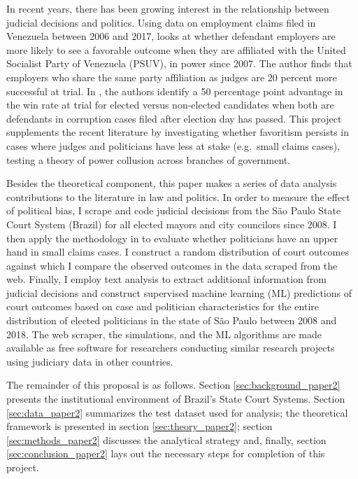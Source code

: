 \documentclass[11pt]{article}
\begin{document}
In recent years, there has been growing interest in the relationship between judicial decisions and politics. Using data on employment claims filed in Venezuela between 2006 and 2017, \citet{Sanchez-MartinezDismantlingInstitutionsCourt2018} looks at whether defendant employers are more likely to see a favorable outcome when they are affiliated with the United Socialist Party of Venezuela (PSUV), in power since 2007. The author finds that employers who share the same party affiliation as judges are 20 percent more successful at trial. In \citet{LambaisJudicialSubversionEvidence2018}, the authors identify a 50 percentage point advantage in the win rate at trial for elected versus non-elected candidates when both are defendants in corruption cases filed after election day has passed. This project supplements the recent literature by investigating whether favoritism persists in cases where judges and politicians have less at stake (e.g.~small claims cases), testing a theory of power collusion across branches of government.

Besides the theoretical component, this paper makes a series of data analysis contributions to the literature in law and politics. In order to measure the effect of political bias, I scrape and code judicial decisions from the São Paulo State Court System (Brazil) for all elected mayors and city councilors since 2008. I then apply the methodology in \citet{AbramsJudgesVaryTheir2012} to evaluate whether politicians have an upper hand in small claims cases. I construct a random distribution of court outcomes against which I compare the observed outcomes in the data scraped from the web. Finally, I employ text analysis to extract additional information from judicial decisions and construct supervised machine learning (ML) predictions of court outcomes based on case and politician characteristics for the entire distribution of elected politicians in the state of São Paulo between 2008 and 2018. The web scraper, the simulations, and the ML algorithms are made available as free software for researchers conducting similar research projects using judiciary data in other countries.

The remainder of this proposal is as follows. Section \ref{sec:background_paper2} presents the institutional environment of Brazil's State Court Systems. Section \ref{sec:data_paper2} summarizes the test dataset used for analysis; the theoretical framework is presented in section \ref{sec:theory_paper2}; section \ref{sec:methods_paper2} discusses the analytical strategy and, finally, section \ref{sec:conclusion_paper2} lays out the necessary steps for completion of this project.
\end{document}

